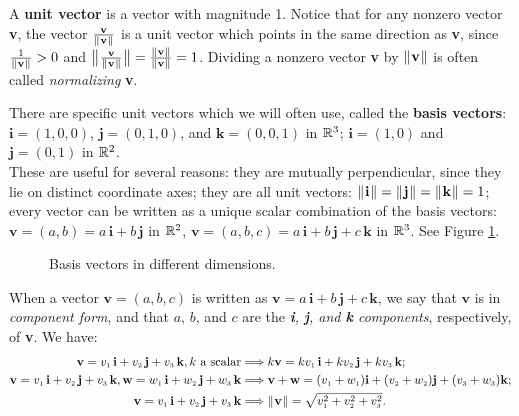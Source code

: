 A \textbf{unit vector} is a vector with magnitude 1.
Notice that for any nonzero vector \textbf{v}, the vector $\frac{\textbf{v}}{\lVert\mspace{1mu}\textbf{v}\mspace{1mu}\rVert}$ is a unit vector which
points in the same direction as \textbf{v}, since $\frac{1}{\lVert\mspace{1mu}\textbf{v}\mspace{1mu}\rVert} > 0$ and
$\bigl\lVert\mspace{1mu}\frac{\textbf{v}}{\lVert\mspace{1mu}\textbf{v}\mspace{1mu}\rVert}\mspace{1mu}\bigr\rVert = \frac{\lVert\mspace{1mu}\textbf{v}\mspace{1mu}\rVert}{\lVert\mspace{1mu}\textbf{v}\mspace{1mu}\rVert} = 1$. Dividing a nonzero
vector \textbf{v} by $\lVert\mspace{1mu}\textbf{v}\mspace{1mu}\rVert$ is often called \emph{normalizing} \textbf{v}.

There are specific unit vectors which we will often use, called the \textbf{basis vectors}:\\
$\textbf{i} = (1,0,0)$, $\textbf{j} = (0,1,0)$, and $\textbf{k} = (0,0,1)$ in $\mathbb{R}^{3}$;
$\textbf{i} = (1,0)$ and $\textbf{j} = (0,1)$ in $\mathbb{R}^{2}$. \\These are useful for several reasons: they are mutually
perpendicular, since they lie on distinct coordinate axes; they are all unit vectors: $\lVert\mspace{1mu}\textbf{i}\mspace{1mu}\rVert =
\lVert\mspace{1mu}\textbf{j}\mspace{1mu}\rVert = \lVert\mspace{1mu}\textbf{k}\mspace{1mu}\rVert = 1$; every vector can be written as a unique scalar combination of the basis
vectors:
$\textbf{v} = (a,b) = a\,\textbf{i} + b\,\textbf{j}$ in $\mathbb{R}^{2}$, $\textbf{v} = (a,b,c) = a\,\textbf{i} +
b\,\textbf{j} + c\,\textbf{k}$ in $\mathbb{R}^{3}$. See Figure \ref{fig:basis}.

\begin{figure}[h]
 \centering
 \quad
 \quad
 \quad
 \caption[]{\quad Basis vectors in different dimensions.}
 \label{fig:basis}
\end{figure}

When a vector $\textbf{v} = (a,b,c)$ is written as $\textbf{v} = a\,\textbf{i} + b\,\textbf{j} + c\,\textbf{k}$, we say
that $\textbf{v}$ is in \emph{component form}, and that $a$, $b$, and $c$ are the
\emph{\textbf{i}, \textbf{j}, and \textbf{k} components}, respectively, of \textbf{v}. We have:
\begin{align*}
 \textbf{v} = v_{\scriptscriptstyle 1}\,\textbf{i} + v_{\scriptscriptstyle 2}\,\textbf{j} + v_{\scriptscriptstyle 3}\,\textbf{k}, k \text{~a scalar} &\Longrightarrow k\textbf{v} = kv_{\scriptscriptstyle 1}\,\textbf{i} + kv_{\scriptscriptstyle 2}\,\textbf{j} + kv_{\scriptscriptstyle 3}\,\textbf{k};\\
 \textbf{v} = v_{\scriptscriptstyle 1}\,\textbf{i} + v_{\scriptscriptstyle 2}\,\textbf{j} + v_{\scriptscriptstyle 3}\,\textbf{k}, \textbf{w} = w_{\scriptscriptstyle 1}\,\textbf{i} + w_{\scriptscriptstyle 2}\,\textbf{j} + w_{\scriptscriptstyle 3}\,\textbf{k} &\Longrightarrow \textbf{v} + \textbf{w} =
 (v_{\scriptscriptstyle 1} + w_{\scriptscriptstyle 1})\textbf{i} + (v_{\scriptscriptstyle 2} + w_{\scriptscriptstyle 2})\textbf{j} + (v_{\scriptscriptstyle 3} + w_{\scriptscriptstyle 3})\textbf{k};\\
 \textbf{v} = v_{\scriptscriptstyle 1}\,\textbf{i} + v_{\scriptscriptstyle 2}\,\textbf{j} + v_{\scriptscriptstyle 3}\,\textbf{k} &\Longrightarrow \lVert\mspace{1mu}\textbf{v}\mspace{1mu}\rVert =
 \sqrt{v_{\scriptscriptstyle 1}^2 + v_{\scriptscriptstyle 2}^2 + v_{\scriptscriptstyle 3}^2}.
\end{align*}

